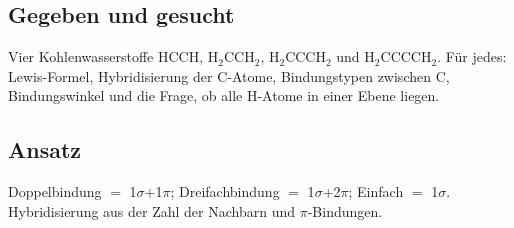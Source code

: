 
\subsection*{Gegeben und gesucht}
Vier Kohlenwasserstoffe $\mathrm{HCCH}$, $\mathrm{H_2CCH_2}$,
$\mathrm{H_2CCCH_2}$ und $\mathrm{H_2CCCCH_2}$. F\"ur jedes: Lewis-Formel,
Hybridisierung der C-Atome, Bindungstypen zwischen C, Bindungswinkel und
die Frage, ob alle H-Atome in einer Ebene liegen.

\subsection*{Ansatz}
Doppelbindung $=$ 1$\sigma$+1$\pi$; Dreifachbindung $=$ 1$\sigma$+2$\pi$;
Einfach $=$ 1$\sigma$. Hybridisierung aus der Zahl der Nachbarn und
$\pi$-Bindungen.

